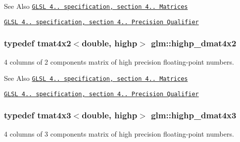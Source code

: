 \begin{DoxySeeAlso}{See Also}
\href{http://www.opengl.org/registry/doc/GLSLangSpec.4.20.8.pdf}{\tt G\-L\-S\-L 4.. specification, section 4.. Matrices} 

\href{http://www.opengl.org/registry/doc/GLSLangSpec.4.20.8.pdf}{\tt G\-L\-S\-L 4.. specification, section 4.. Precision Qualifier} 
\end{DoxySeeAlso}
\hypertarget{group__core__precision_gaa0a2369be2e3d5a4db98cae345413dc1}{
\subsubsection[{highp\-\_\-dmat4x2}]{\setlength{\rightskip}{0pt plus 5cm}typedef tmat4x2$<$double, highp$>$ {\bf glm\-::highp\-\_\-dmat4x2}}}\label{group__core__precision_gaa0a2369be2e3d5a4db98cae345413dc1}
4 columns of 2 components matrix of high precision floating-\/point numbers.

\begin{DoxySeeAlso}{See Also}
\href{http://www.opengl.org/registry/doc/GLSLangSpec.4.20.8.pdf}{\tt G\-L\-S\-L 4.. specification, section 4.. Matrices} 

\href{http://www.opengl.org/registry/doc/GLSLangSpec.4.20.8.pdf}{\tt G\-L\-S\-L 4.. specification, section 4.. Precision Qualifier} 
\end{DoxySeeAlso}
\hypertarget{group__core__precision_gaec00d802f271a807485a0069cdb5ea05}{
\subsubsection[{highp\-\_\-dmat4x3}]{\setlength{\rightskip}{0pt plus 5cm}typedef tmat4x3$<$double, highp$>$ {\bf glm\-::highp\-\_\-dmat4x3}}}\label{group__core__precision_gaec00d802f271a807485a0069cdb5ea05}
4 columns of 3 components matrix of high precision floating-\/point numbers.

